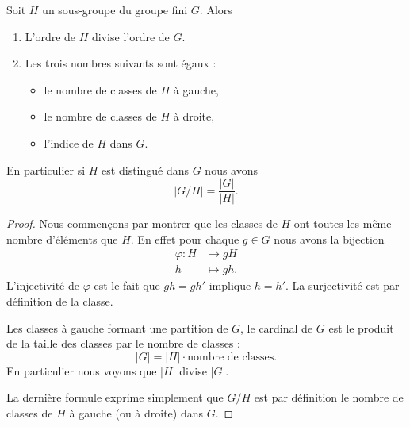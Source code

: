 \begin{theorem}      \label{ThoLagrange}
    Soit \( H\) un sous-groupe du groupe fini \( G\).  Alors
    \begin{enumerate}
        \item
    L'ordre de \( H\) divise l'ordre de \( G\).
\item 
    Les trois nombres suivants sont égaux :
    \begin{itemize}
        \item
            le nombre de classes de \( H\) à gauche,
        \item
            le nombre de classes de \( H\) à droite,
        \item
            l'indice de \( H\) dans \( G\).
    \end{itemize}
    \end{enumerate}
    En particulier si \( H\) est distingué dans \( G\) nous avons
    \begin{equation}
        | G/H |=\frac{ | G | }{ | H | }.
    \end{equation}
\end{theorem}

\begin{proof}
    Nous commençons par montrer que les classes de \( H\) ont toutes les même nombre d'éléments que \( H\). En effet pour chaque \( g\in G\) nous avons la bijection
    \begin{equation}
        \begin{aligned}
            \varphi\colon H&\to gH \\
            h&\mapsto gh. 
        \end{aligned}
    \end{equation}
    L'injectivité de \( \varphi\) est le fait que \( gh=gh'\) implique \( h=h'\). La surjectivité est par définition de la classe. 

    Les classes à gauche formant une partition de \( G\), le cardinal de \( G\) est le produit de la taille des classes par le nombre de classes :
    \begin{equation}
        | G |=| H |\cdot\text{nombre de classes}.
    \end{equation}
    En particulier nous voyons que \( | H |\) divise \( | G |\).

    La dernière formule exprime simplement que \( G/H\) est par définition le nombre de classes de \( H\) à gauche (ou à droite) dans \( G\).
\end{proof}

